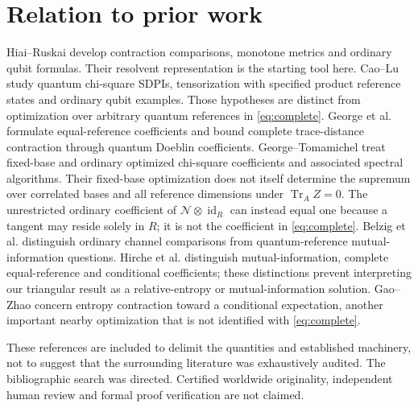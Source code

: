 \documentclass[11pt]{article}
\newcommand{\Tr}{\operatorname{Tr}}
\newcommand{\id}{\operatorname{id}}
\newcommand{\N}{\mathcal N}
\theoremstyle{remark}
\begin{document}
\section{Relation to prior work}
Hiai--Ruskai \cite{HR} develop contraction comparisons, monotone metrics and ordinary qubit formulas. Their resolvent representation is the starting tool here.
Cao--Lu \cite{CL} study quantum chi-square SDPIs, tensorization with specified product reference states and ordinary qubit examples. Those hypotheses are distinct from optimization over arbitrary quantum references in \eqref{eq:complete}.
George et al. \cite{Doeblin} formulate equal-reference coefficients and bound complete trace-distance contraction through quantum Doeblin coefficients. George--Tomamichel \cite{GT} treat fixed-base and ordinary optimized chi-square coefficients and associated spectral algorithms. Their fixed-base optimization does not itself determine the supremum over correlated bases and all reference dimensions under \(\Tr_A Z=0\). The unrestricted ordinary coefficient of \(\N\otimes\id_R\) can instead equal one because a tangent may reside solely in \(R\); it is not the coefficient in \eqref{eq:complete}.
Belzig et al. \cite{Reverse} distinguish ordinary channel comparisons from quantum-reference mutual-information questions.
Hirche et al. \cite{Conditional} distinguish mutual-information, complete equal-reference and conditional coefficients; these distinctions prevent interpreting our triangular result as a relative-entropy or mutual-information solution.
Gao--Zhao \cite{GZ} concern entropy contraction toward a conditional expectation, another important nearby optimization that is not identified with \eqref{eq:complete}.

These references are included to delimit the quantities and established machinery, not to suggest that the surrounding literature was exhaustively audited.
The bibliographic search was directed. Certified worldwide originality, independent human review and formal proof verification are not claimed.
\end{document}

